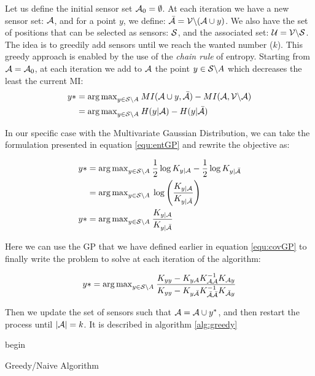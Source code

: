  Let us define the initial sensor set $\A_0 = \emptyset$. At each iteration we have a new sensor set: $\A$,  and for a point $y$, we define: $\bar{\A} = \V \backslash ( \A \cup y )$. We also have the set of positions that can be selected as sensors: $\S$,  and the associated set: $\U = \V \backslash \S $. \\
 
 
 The idea is to greedily add sensors until we reach the wanted number ($k$).   This greedy approach is enabled by the use of the \textit{chain rule} of entropy.  Starting from $\A = \A_0$, at each iteration we add to $\A$ the point $y \in \S \backslash A $ which decreases the least the current MI: 
\begin{align}
    y* &= {\arg \max}_{y \in \S \backslash A } \: MI(\A \cup y, \bar{\A} ) - MI(\A, \VA) \\
    &= {\arg \max}_{y \in \S \backslash A } \: H(y | \A ) - H(y | \bar{\A} )
\end{align}

In our specific case with the Multivariate Gaussian Distribution, we can take the formulation presented in equation \ref{equ:entGP} and rewrite the objective as: 

\begin{align}
    y*  &= {\arg \max}_{y \in \S \backslash A } \: \frac{1}{2} \log K_{y | \A} - \frac{1}{2} \log K_{y | \bar{\A}} \\
    &= {\arg \max}_{y \in \S \backslash A } \: \log \left(\frac{K_{y | \A}}{K_{y | \bar{\A}}} \right) \\
    y* &= {\arg \max}_{y \in \S \backslash A } \: \frac{K_{y | \A}}{K_{y | \bar{\A}}}
\end{align}

Here we can use the GP that we have defined earlier in equation \ref{equ:covGP} to finally write the problem to solve at each iteration of the algorithm: 

\begin{equation}
    y*  = {\arg \max}_{y \in \S \backslash A } \: \frac{K_{yy} - K_{y\A} K_{\A\A}^{-1} K_{\A y} }{K_{yy} - K_{y\bar{\A}} K_{\bar{\A}\bar{\A}}^{-1} K_{\bar{\A} y} } \label{equ:updateGreedy}
\end{equation}

Then we update the set of sensors such that $\A = \A \cup y^*$, and then restart the process until $|\A| = k$. It is described in algorithm \ref{alg:greedy}  \\

\begin{algorithm}[h!]
 begin\;
 \caption{Greedy/Naive Algorithm}
 \label{alg:greedy}
\end{algorithm}


